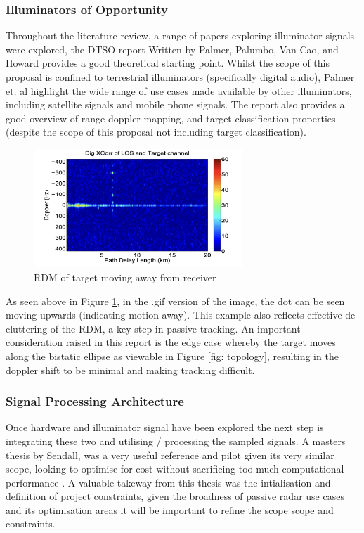 \documentclass[12pt,a4paper]{article}
\begin{document}
\subsubsection{Illuminators of Opportunity}
Throughout the literature review, a range of papers exploring illuminator signals were explored, the DTSO report Written by Palmer, Palumbo, Van Cao, and Howard provides a good theoretical starting point. Whilst the scope of this proposal is confined to terrestrial illuminators (specifically digital audio), Palmer et. al highlight the wide range of use cases made available by other illuminators, including satellite signals and mobile phone signals. The report also provides a good overview of range doppler mapping, and target classification properties (despite the scope of this proposal not including target classification).

\begin{figure}[htbp]
    \centering
    \includegraphics[width=0.7\textwidth]{movingTarget.jpg}
    \caption{RDM of target moving away from receiver \cite{DTSO2009}}
    \label{fig:rdm}
\end{figure}

\noindent As seen above in Figure \ref{fig:rdm}, in the .gif version of the image, the dot can be seen moving upwards (indicating motion away). This example also reflects effective de-cluttering of the RDM, a key step in passive tracking. An important consideration raised in this report is the edge case whereby the target moves along the bistatic ellipse as viewable in Figure \ref{fig: topology}, resulting in the doppler shift to be minimal and making tracking difficult.

\subsubsection{Signal Processing Architecture}
Once hardware and illuminator signal have been explored the next step is integrating these two and utilising / processing the sampled signals. A masters thesis by Sendall, was a very useful reference and pilot given its very similar scope, looking to optimise for cost without sacrificing too much computational performance \cite{FMlowCost}. A valuable takeway from this thesis was the intialisation and definition of project constraints, given the broadness of passive radar use cases and its optimisation areas it will be important to refine the scope scope and constraints.
\end{document}
